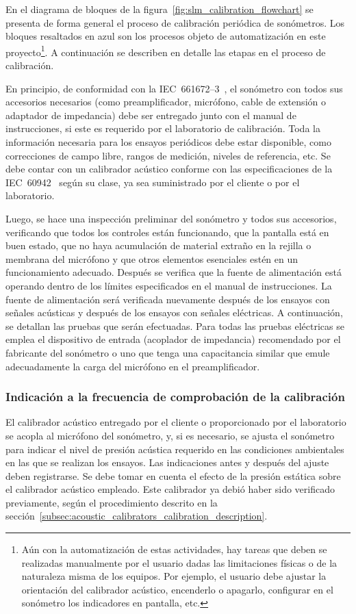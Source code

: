 %
En el diagrama de bloques de la figura~\ref{fig:slm_calibration_flowchart} se presenta de forma general el proceso de calibración periódica de sonómetros.
Los bloques resaltados en azul son los procesos objeto de automatización en este proyecto\footnote{Aún con la automatización de estas actividades, hay tareas que deben se realizadas manualmente por el usuario dadas las limitaciones físicas o de la naturaleza misma de los equipos. Por ejemplo, el usuario debe ajustar la orientación del calibrador acústico, encenderlo o apagarlo, configurar en el sonómetro los indicadores en pantalla, etc.}.
A continuación se describen en detalle las etapas en el proceso de calibración.

En principio, de conformidad con la \mbox{IEC 661672--3}~\citeyearpar{IEC_TC29_2013_3}, el sonómetro con todos sus accesorios necesarios (como preamplificador, micrófono, cable de extensión o adaptador de impedancia) debe ser entregado junto con el manual de instrucciones, si este es requerido por el laboratorio de calibración.
Toda la información necesaria para los ensayos periódicos debe estar disponible, como correcciones de campo libre, rangos de medición, niveles de referencia, etc.
Se debe contar con un calibrador acústico conforme con las especificaciones de la \mbox{IEC 60942}~\citeyearpar{IEC_TC29_2017} según su clase, ya sea suministrado por el cliente o por el laboratorio.

Luego, se hace una inspección preliminar del sonómetro y todos sus accesorios, verificando que todos los controles están funcionando, que la pantalla está en buen estado, que no haya acumulación de material extraño en la rejilla o membrana del micrófono y que otros elementos esenciales estén en un funcionamiento adecuado.
Después se verifica que la fuente de alimentación está operando dentro de los límites especificados en el manual de instrucciones.
La fuente de alimentación será verificada nuevamente después de los ensayos con señales acústicas y después de los ensayos con señales eléctricas.
A continuación, se detallan las pruebas que serán efectuadas.
Para todas las pruebas eléctricas se emplea el dispositivo de entrada (acoplador de impedancia) recomendado por el fabricante del sonómetro o uno que tenga una capacitancia similar que emule adecuadamente la carga del micrófono en el preamplificador.

\subsubsection{Indicación a la frecuencia de comprobación de la calibración}
El calibrador acústico entregado por el cliente o proporcionado por el laboratorio se acopla al micrófono del sonómetro, y, si es necesario, se ajusta el sonómetro para indicar el nivel de presión acústica requerido en las condiciones ambientales en las que se realizan los ensayos.
Las indicaciones antes y después del ajuste deben registrarse.
Se debe tomar en cuenta el efecto de la presión estática sobre el calibrador acústico empleado.
Este calibrador ya debió haber sido verificado previamente, según el procedimiento descrito en la sección~\ref{subsec:acoustic_calibrators_calibration_description}.

